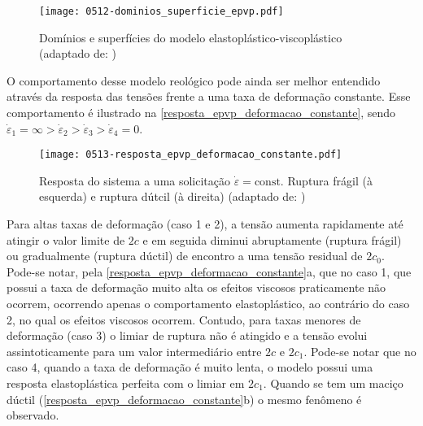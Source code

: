 \begin{figure}[H]
	\begin{center}
		\texttt{[image: 0512-dominios\_superficie\_epvp.pdf]}
	\end{center}
	\caption{\label{dominios_debernardi}Domínios e superfícies do modelo elastoplástico-viscoplástico (adaptado de: )}
\end{figure}
O comportamento desse modelo reológico pode ainda ser melhor entendido através da resposta das tensões frente a uma taxa de deformação constante. Esse comportamento é ilustrado na \autoref{resposta_epvp_deformacao_constante}, sendo $\dot \varepsilon_1 = \infty > \dot \varepsilon_2 > \dot \varepsilon_3 > \dot \varepsilon_4 = 0$.
\begin{figure}[H]
	\begin{center}
		\texttt{[image: 0513-resposta\_epvp\_deformacao\_constante.pdf]}
	\end{center}
	\caption{\label{resposta_epvp_deformacao_constante}Resposta do sistema a uma solicitação $\dot \varepsilon = \text{const}$. Ruptura frágil (à esquerda) e ruptura dútcil (à direita) (adaptado de: )}
\end{figure}
Para altas taxas de deformação (caso 1 e 2), a tensão aumenta rapidamente até atingir o valor limite de $2c$ e em seguida diminui abruptamente (ruptura frágil) ou gradualmente (ruptura dúctil) de encontro a uma tensão residual de $2c_0$. Pode-se notar, pela \autoref{resposta_epvp_deformacao_constante}a, que no caso 1, que possui a taxa de deformação muito alta os efeitos viscosos praticamente não ocorrem, ocorrendo apenas o comportamento elastoplástico, ao contrário do caso 2, no qual os efeitos viscosos ocorrem. Contudo, para taxas menores de deformação (caso 3) o limiar de ruptura não é atingido e a tensão evolui assintoticamente para um valor intermediário entre $2c$ e $2c_1$. Pode-se notar que no caso 4, quando a taxa de deformação é muito lenta, o modelo possui uma resposta elastoplástica perfeita com o limiar em $2c_1$. Quando se tem um maciço dúctil (\autoref{resposta_epvp_deformacao_constante}b) o mesmo fenômeno é observado.